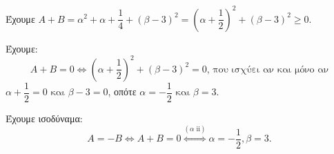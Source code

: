
\begin{alist}
\item 
\begin{rlist}
\item Έχουμε $A + B = \alpha^2 + \alpha + \dfrac{1}{4} + (\beta - 3)^2 = \left(\alpha + \dfrac{1}{2}\right)^2 + (\beta - 3)^2 \ge 0$.
\item Έχουμε:
\[A + B = 0 \Leftrightarrow \left(\alpha + \dfrac{1}{2}\right)^2 + (\beta - 3)^2 = 0\text{, που ισχύει αν και μόνο αν}\]
$\alpha + \dfrac{1}{2} = 0 \text{ και } \beta - 3 = 0$, οπότε $\alpha = -\dfrac{1}{2} \text{ και } \beta = 3$.
\end{rlist}

\item Έχουμε ισοδύναμα:
\[A = -B \Leftrightarrow A + B = 0 \stackrel{(\alpha \text{ ii})}{\Leftrightarrow} \alpha = -\dfrac{1}{2}, \beta = 3.\]
\end{alist}


